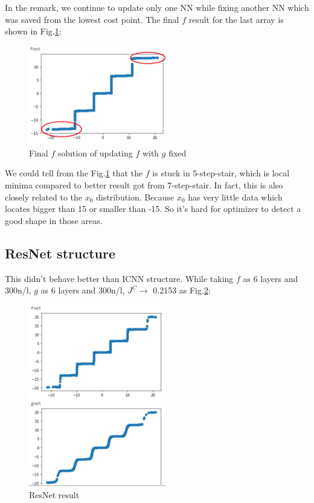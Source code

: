 \documentclass[conference,compsoc]{IEEEtran}
\begin{document}
  In the remark, we continue to update only one NN while fixing another NN which was saved from the lowest cost point. The final $f$ result for the last array is shown in Fig.\ref{fig:Table2_last_column_continue_to_update_f}:
\begin{figure}[htp]
    \centering
    \includegraphics[width=6cm]{images/Table2_last_column_continue_to_update_f.png}
    \caption{Final $f$ solution of updating $f$ with $g$ fixed}
    \label{fig:Table2_last_column_continue_to_update_f}
\end{figure}

We could tell from the Fig.\ref{fig:Table2_last_column_continue_to_update_f} that the $f$ is stuck in 5-step-stair, which is local minima compared to better result got from 7-step-stair. In fact, this is also closely related to the $x_0$ distribution. Because $x_0$ has very little data which locates bigger than 15 or smaller than -15. So it's hard for optimizer to detect a good shape in those areas.

\subsection{ResNet structure}
This didn't behave better than ICNN structure. While taking $f$ as 6 layers and 300n/l, $g$ as 6 layers and 300n/l, $J^C\rightarrow$ 0.2153 as Fig.\ref{fig:resnet_best_result}:
\begin{figure}[htp]
  \centering
  \includegraphics[width=6cm]{images/resnet_best_result.png}
  \caption{ResNet result}
  \label{fig:resnet_best_result}
\end{figure}
\end{document}
